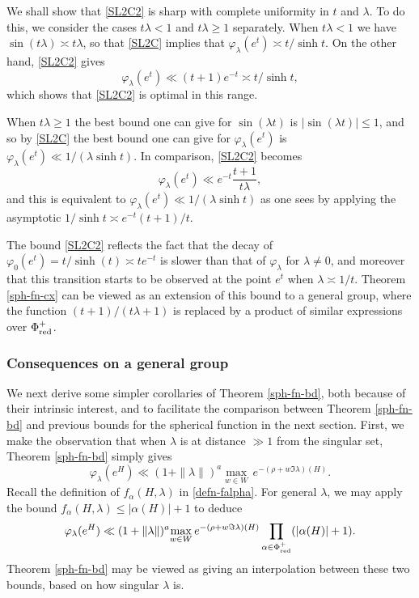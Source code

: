 \documentclass[12pt]{amsart}
\theoremstyle{remark}
\newcommand{\be}{\begin{equation}}
\newcommand{\ee}{\end{equation}}
\begin{document}
We shall show that \eqref{SL2C2} is sharp with complete uniformity in $t$ and $\lambda$.  To do this, we consider the cases $t\lambda < 1$ and $t \lambda \ge 1$ separately.  When $t\lambda < 1$ we have $\sin(t \lambda) \asymp t\lambda$, so that \eqref{SL2C} implies that $\varphi_\lambda(e^t) \asymp t / \sinh t$.  On the other hand, \eqref{SL2C2} gives
\[
\varphi_\lambda(e^t) \ll (t+1) e^{-t} \asymp t / \sinh t,
\]
which shows that \eqref{SL2C2} is optimal in this range.

When $t\lambda \ge 1$ the best bound one can give for $\sin(\lambda t)$ is $|\sin(\lambda t)| \le 1$, and so by \eqref{SL2C} the best bound one can give for $\varphi_\lambda(e^t)$ is $\varphi_\lambda(e^t) \ll 1/(\lambda \sinh t)$.  In comparison, \eqref{SL2C2} becomes
\[
\varphi_\lambda(e^t) \ll e^{-t} \frac{t+1}{t\lambda},
\]
and this is equivalent to $\varphi_\lambda(e^t) \ll 1/(\lambda \sinh t)$ as one sees by applying the asymptotic $1/\sinh t \asymp e^{-t}(t+1)/t$.

The bound \eqref{SL2C2} reflects the fact that the decay of $\varphi_0(e^t) = t / \sinh(t) \asymp t e^{-t}$ is slower than that of $\varphi_\lambda$ for $\lambda \neq 0$, and moreover that this transition starts to be observed at the point $e^t$ when $\lambda \asymp 1/t$.  Theorem \ref{sph-fn-cx} can be viewed as an extension of this bound to a general group, where the function $(t+1)/(t\lambda +1)$ is replaced by a product of similar expressions over $\Phi_\textnormal{red}^+$.

\subsubsection{Consequences on a general group}

We next derive some simpler corollaries of Theorem \ref{sph-fn-bd}, both because of their intrinsic interest, and to facilitate the comparison between Theorem \ref{sph-fn-bd} and previous bounds for the spherical function in the next section.  First, we make the observation that when $\lambda$ is at distance $\gg 1$ from the singular set, Theorem \ref{sph-fn-bd} simply gives
\be
\label{sphericalcor1}
\varphi_\lambda(e^H) \ll (1 + \| \lambda \|)^a \underset{w \in W}{\max} \, e^{-(\rho + w \Im \lambda)(H) }.
\ee
Recall the definition of $f_\alpha(H,\lambda)$ in \eqref{defn-falpha}. For general $\lambda$, we may apply the bound $f_\alpha(H,\lambda) \le |\alpha(H)| + 1$ to deduce
\be
\label{sphericalcor2}
\varphi_\lambda(e^H) \ll (1 + \| \lambda \|)^a \underset{w \in W}{\max} \, e^{-(\rho + w \Im \lambda)(H) } \prod_{\alpha \in \Phi_\textnormal{red}^+} (|\alpha(H)| + 1).
\ee
Theorem \ref{sph-fn-bd} may be viewed as giving an interpolation between these two bounds, based on how singular $\lambda$ is.  
\end{document}
